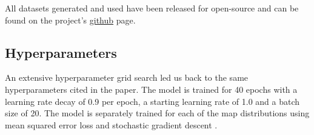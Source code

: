 All datasets generated and used have been released for open-source and can be found on the project's \href{https://anonymous.4open.science/r/Differentiable-Spatial-Planning-using-Transformers-7107}{github} page.

\subsection{Hyperparameters}
An extensive hyperparameter grid search led us back to the same hyperparameters cited in the paper. The model is trained for 40 epochs with a learning rate decay of 0.9 per epoch, a starting learning rate of 1.0 and a batch size of 20. The model is separately trained for each of the map distributions using mean squared error loss and stochastic gradient descent \cite{ketkar2017stochastic}.

